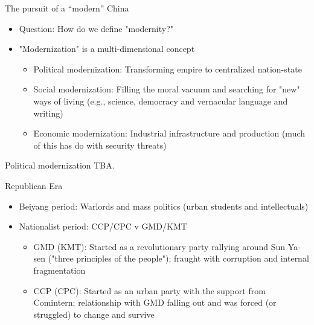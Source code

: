 \documentclass[
  10pt,
  ignorenonframetext,
]{beamer}
\begin{document}
\begin{frame}{The pursuit of a ``modern'' China}
\protect\hypertarget{the-pursuit-of-a-modern-china}{}
\begin{itemize}
  \item Question: How do we define "modernity?"
  \pause
  \vspace{0.3cm}
  \item "Modernization" is a multi-dimensional concept
  \vspace{0.1cm}
  \begin{itemize}
    \item Political modernization: Transforming empire to centralized nation-state
    \item Social modernization: Filling the moral vacuum and searching for "new" ways of living (e.g., science, democracy and vernacular language and writing)
    \item Economic modernization: Industrial infrastructure and production (much of this has do with security threats)
  \end{itemize}
\end{itemize}
\end{frame}

\begin{frame}{Political modernization}
\protect\hypertarget{political-modernization}{}
TBA.
\end{frame}

\begin{frame}{Republican Era}
\protect\hypertarget{republican-era}{}
\begin{itemize}
  \item Beiyang period: Warlords and mass politics (urban students and intellectuals)
  \vspace{0.3cm}
  \item Nationalist period: CCP/CPC v GMD/KMT
  \vspace{0.1cm}
  \begin{itemize}
    \item GMD (KMT): Started as a revolutionary party rallying around Sun Ya-sen ("three principles of the people"); fraught with corruption and internal fragmentation
    \item CCP (CPC): Started as an urban party with the support from Comintern; relationship with GMD falling out and was forced (or struggled) to change and survive
  \end{itemize}
\end{itemize}
\end{frame}
\end{document}
